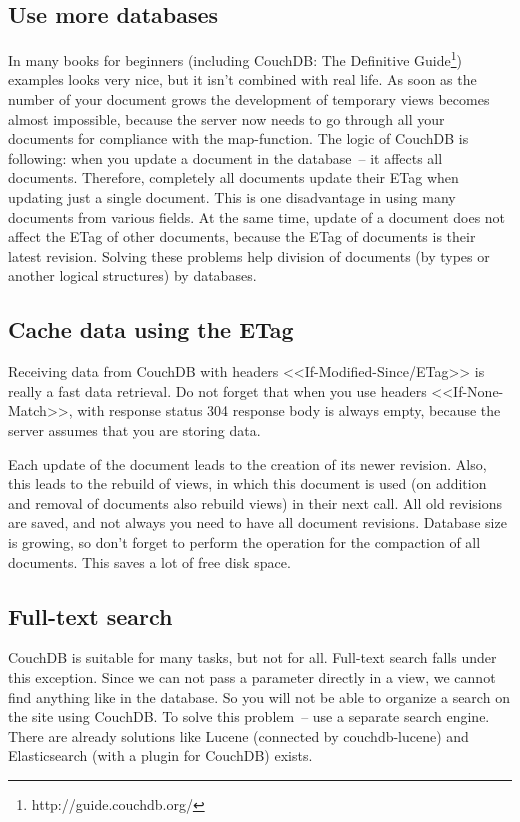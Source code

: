 \subsection{Use more databases}

In many books for beginners (including CouchDB: The Definitive Guide\footnote{http://guide.couchdb.org/}) examples looks very nice, but it isn’t combined with real life. As soon as the number of your document grows the development of temporary views becomes almost impossible, because the server now needs to go through all your documents for compliance with the map-function. The logic of CouchDB is following: when you update a document in the database~-- it affects all documents. Therefore, completely all documents update their ETag when updating just a single document. This is one disadvantage in using many documents from various fields. At the same time, update of a document does not affect the ETag of other documents, because the ETag of documents is their latest revision. Solving these problems help division of documents (by types or another logical structures) by databases.

\subsection{Cache data using the ETag}

Receiving data from CouchDB with headers <<If-Modified-Since/ETag>> is really a fast data retrieval. Do not forget that when you use headers <<If-None-Match>>, with response status 304 response body is always empty, because the server assumes that you are storing data.

Each update of the document leads to the creation of its newer revision. Also, this leads to the rebuild of views, in which this document is used (on addition and removal of documents also rebuild views) in their next call. All old revisions are saved, and not always you need to have all document revisions. Database size is growing, so don't forget to perform the operation for the compaction of all documents. This saves a lot of free disk space.

\subsection{Full-text search}

CouchDB is suitable for many tasks, but not for all. Full-text search falls under this exception. Since we can not pass a parameter directly in a view, we cannot find anything like in the database. So you will not be able to organize a search on the site using CouchDB. To solve this problem~-- use a separate search engine. There are already solutions like Lucene (connected by couchdb-lucene) and Elasticsearch (with a plugin for CouchDB) exists.

